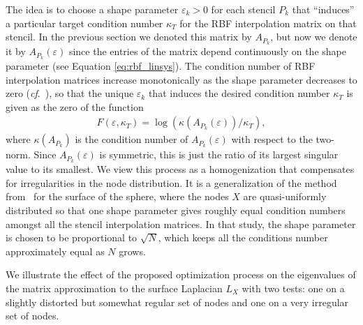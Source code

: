 \documentclass[smallextended]{svjour3}
\newcommand{\ep}{\varepsilon}
\begin{document}
The idea is to choose a shape parameter $\ep_k > 0$ for each stencil $P_k$ that ``induces'' a particular target condition number $\kappa_T$ for the RBF interpolation matrix on that stencil. In the previous section we denoted this matrix by $A_{P_k}$, but now we denote it by $A_{P_k}(\ep)$ since the entries of the matrix depend continuously on the shape parameter (see Equation \eqref{eq:rbf_linsys}). The condition number of RBF interpolation matrices increase monotonically as the shape parameter decreases to zero (\emph{cf}.~\cite{FZ07}), so that the unique $\ep_k$ that induces the desired condition number $\kappa_T$ is given as the zero of the function
\begin{align}
F(\ep,\kappa_T) = \log( \kappa(A_{P_k}(\ep))/\kappa_T),
\label{eq:target_cond}
\end{align}  
where $\kappa(A_{P_k})$ is the condition number of $A_{P_k}(\ep)$ with respect to the two-norm.  Since $A_{P_k}(\ep)$ is symmetric, this is just the ratio of its largest singular value to its smallest.  We view this process as a homogenization that compensates for irregularities in the node distribution. It is a generalization of the method from~\cite{FlyerLehto2012} for the surface of the sphere, where the nodes $X$ are quasi-uniformly distributed so that one shape parameter gives roughly equal condition numbers amongst all the stencil interpolation matrices.  In that study, the shape parameter is chosen to be proportional to $\sqrt{N}$, which keeps all the conditions number approximately equal as $N$ grows.

We illustrate the effect of the proposed optimization process on the eigenvalues of the matrix approximation to the surface Laplacian $L_X$ with two tests: one on a slightly distorted but somewhat regular set of nodes and one on a very irregular set of nodes.  
\end{document}
